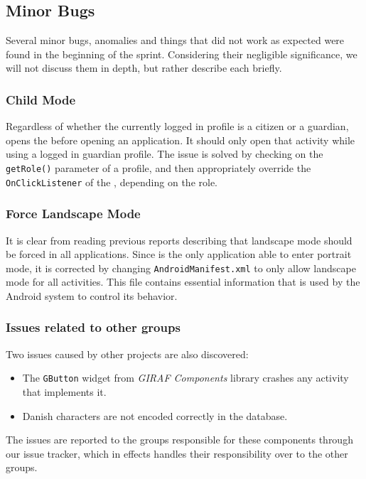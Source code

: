 \subsection{Minor Bugs}

Several minor bugs, anomalies and things that did not work as expected were found in the beginning of the sprint.
Considering their negligible significance, we will not discuss them in depth, but rather describe each briefly.

\subsubsection{Child Mode}
Regardless of whether the currently logged in profile is a citizen or a guardian, \launcher opens the \profileselectionactivity before opening an application.
It should only open that activity while using a logged in guardian profile.
The issue is solved by checking on the \lstinline{getRole()} parameter of a profile, and then appropriately override the \lstinline{OnClickListener} of the \profileselectionactivity, depending on the role. 

\subsubsection{Force Landscape Mode}
It is clear from reading previous reports describing \launcher that landscape mode should be forced in all \giraf applications.
Since \launcher is the only application able to enter portrait mode, it is corrected by changing \lstinline{AndroidManifest.xml} to only allow landscape mode for all activities.
This file contains essential information that is used by the Android system to control its behavior\cite{appManifest}.

\subsubsection{Issues related to other groups}
Two issues caused by other projects are also discovered:

\begin{itemize}
\item The \lstinline{GButton} widget from \textit{GIRAF Components} library crashes any activity that implements it.
\item Danish characters are not encoded correctly in the database.
\end{itemize}

The issues are reported to the groups responsible for these components through our issue tracker, which in effects handles their responsibility over to the other groups.